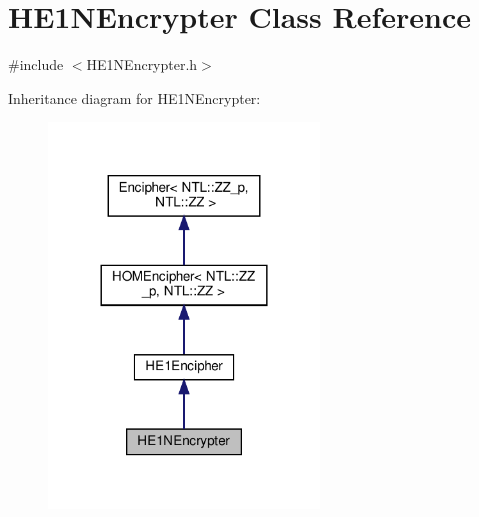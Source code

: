 \hypertarget{classHE1NEncrypter}{}\section{H\+E1\+N\+Encrypter Class Reference}
\label{classHE1NEncrypter}


{\ttfamily \#include $<$H\+E1\+N\+Encrypter.\+h$>$}



Inheritance diagram for H\+E1\+N\+Encrypter\+:\nopagebreak
\begin{figure}[H]
\begin{center}
\leavevmode
\includegraphics[width=204pt]{classHE1NEncrypter__inherit__graph}
\end{center}
\end{figure}


